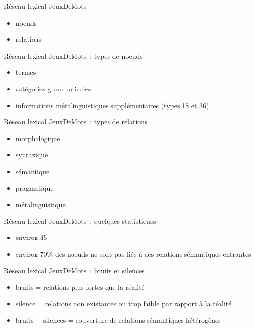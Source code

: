 \documentclass{beamer}
\begin{document}
\begin{frame}
  Réseau lexical JeuxDeMots
  \begin{itemize}
  \item noeuds
  \item relations
  \end{itemize}
\end{frame}

\begin{frame}
  Réseau lexical JeuxDeMots~: types de noeuds
  \begin{itemize}
  \item termes
  \item catégories grammaticales
  \item informations métalinguistiques supplémentaires (types 18 et 36)
  \end{itemize}
\end{frame}

\begin{frame}
  Réseau lexical JeuxDeMots~: types de relations
  \begin{itemize}
  \item morphologique
  \item syntaxique
  \item sémantique
  \item pragmatique
  \item métalinguistique
  \end{itemize}
\end{frame}

\begin{frame}
  Réseau lexical JeuxDeMots~: quelques statistiques
  \begin{itemize}
  \item environ 45%
  \item environ 70\% des noeuds ne sont pas liés à des relations sémantiques entrantes
  \end{itemize}
\end{frame}

\begin{frame}
  Réseau lexical JeuxDeMots~: bruits et silences
  \begin{itemize}
  \item bruits = relations plus fortes que la réalité 
  \item silence = relations non existantes ou trop faible par rapport à la réalité 
  \item bruits + silences = couverture de relations sémantiques hétérogènes
  \end{itemize}
\end{frame}
\end{document}
